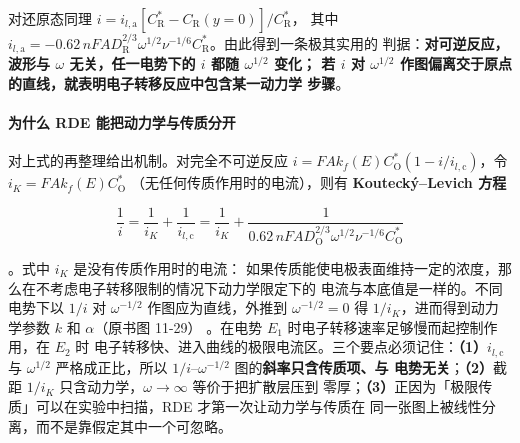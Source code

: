 对还原态同理 $i=i_{l,\mathrm{a}}[C_{\mathrm{R}}^{*}-C_{\mathrm{R}}(y=0)]/C_{\mathrm{R}}^{*}$，
其中 $i_{l,\mathrm{a}}=-0.62\,nFAD_{\mathrm{R}}^{2/3}\omega^{1/2}\nu^{-1/6}
C_{\mathrm{R}}^{*}$。由此得到一条极其实用的
判据：\textbf{对可逆反应，波形与 $\omega$ 无关，任一电势下的 $i$ 都随 $\omega^{1/2}$ 变化；
若 $i$ 对 $\omega^{1/2}$ 作图偏离交于原点的直线，就表明电子转移反应中包含某一动力学
步骤}。

\paragraph{为什么 RDE 能把动力学与传质分开} 对上式的再整理给出机制。对完全不可逆反应
$i=FAk_f(E)C_{\mathrm{O}}^{*}(1-i/i_{l,\mathrm{c}})$，令 $i_K=FAk_f(E)C_{\mathrm{O}}^{*}$
（无任何传质作用时的电流），则有 \textbf{Koutecký--Levich 方程}

\begin{equation}
\frac{1}{i}=\frac{1}{i_K}+\frac{1}{i_{l,\mathrm{c}}}
=\frac{1}{i_K}+\frac{1}{0.62\,nFAD_{\mathrm{O}}^{2/3}\omega^{1/2}\nu^{-1/6}C_{\mathrm{O}}^{*}}
\label{eq:kl}
\end{equation}

。式中 $i_K$ 是没有传质作用时的电流：
如果传质能使电极表面维持一定的浓度，那么在不考虑电子转移限制的情况下动力学限定下的
电流与本底值是一样的。不同电势下以 $1/i$ 对 $\omega^{-1/2}$ 作图应为直线，外推到
$\omega^{-1/2}=0$ 得 $1/i_K$，进而得到动力学参数 $k$ 和 $\alpha$（原书图 11-29）
。在电势 $E_1$ 时电子转移速率足够慢而起控制作用，在 $E_2$ 时
电子转移快、进入曲线的极限电流区。三个要点必须记住：\textbf{（1）}$i_{l,\mathrm{c}}$ 与
$\omega^{1/2}$ 严格成正比，所以 $1/i$–$\omega^{-1/2}$ 图的\textbf{斜率只含传质项、与
电势无关}；\textbf{（2）}截距 $1/i_K$ 只含动力学，$\omega\to\infty$ 等价于把扩散层压到
零厚；\textbf{（3）}正因为「极限传质」可以在实验中扫描，RDE 才第一次让动力学与传质在
同一张图上被线性分离，而不是靠假定其中一个可忽略。

